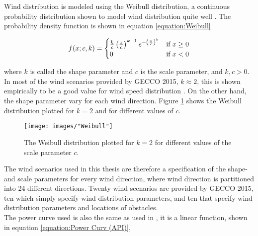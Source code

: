 \noindent Wind distribution is modeled using the Weibull distribution, a continuous probability distribution shown to model wind distribution quite well \citep{Justus}. The probability density function is shown in equation \ref{equation:Weibull}


\begin{equation}
f(x; c, k)  = 
\begin{cases}
\frac{k}{c} \left( \frac{x}{c} \right)^{k-1} e^{- \left( \frac{x}{c} \right)^k } & \text{if} \hspace{1mm} x \geq 0 \\
0                                                                                                                      & \text{if} \hspace{1mm}     x < 0
\end{cases}
\label{equation:Weibull}
\end{equation}


\noindent where $k$ is called the shape parameter and $c$ is the scale parameter, and $k, c > 0$. In most of the wind scenarios provided by GECCO 2015, $k \approx 2$, this is shown empirically to be a good value for wind speed distribution \citep{Justus}. On the other hand, the shape parameter vary for each wind direction. Figure \ref{figure:weibull distribution} shows the Weibull distribution plotted for $k = 2$ and for different values of $c$. \\


\begin{figure}[h!]
\begin{center}
\texttt{[image: images/"Weibull"]}
\caption{The Weibull distribution plotted for $k = 2$ for different values of the scale parameter $c$.}
\label{figure:weibull distribution}
\end{center}
\end{figure}

\noindent The wind scenarios used in this thesis are therefore a specification of the shape- and scale parameters for every wind direction, where wind direction is partitioned into 24 different directions. Twenty wind scenarios are provided by GECCO 2015, ten which simply specify wind distribution parameters, and ten that specify wind distribution parameters and locations of obstacles. \\

\noindent The power curve used is also the same as used in \cite{Kusiak}, it is a linear function, shown in equation \ref{equation:Power Curv (API)},

